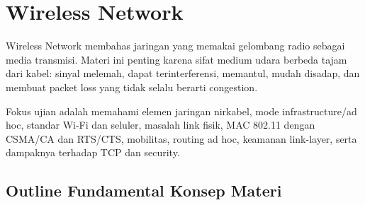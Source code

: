\section{Wireless Network}

Wireless Network membahas jaringan yang memakai gelombang radio sebagai media transmisi. Materi ini penting karena sifat medium udara berbeda tajam dari kabel: sinyal melemah, dapat terinterferensi, memantul, mudah disadap, dan membuat packet loss yang tidak selalu berarti congestion.

Fokus ujian adalah memahami elemen jaringan nirkabel, mode infrastructure/ad hoc, standar Wi-Fi dan seluler, masalah link fisik, MAC 802.11 dengan CSMA/CA dan RTS/CTS, mobilitas, routing ad hoc, keamanan link-layer, serta dampaknya terhadap TCP dan security.

\subsection{Outline Fundamental Konsep Materi}

